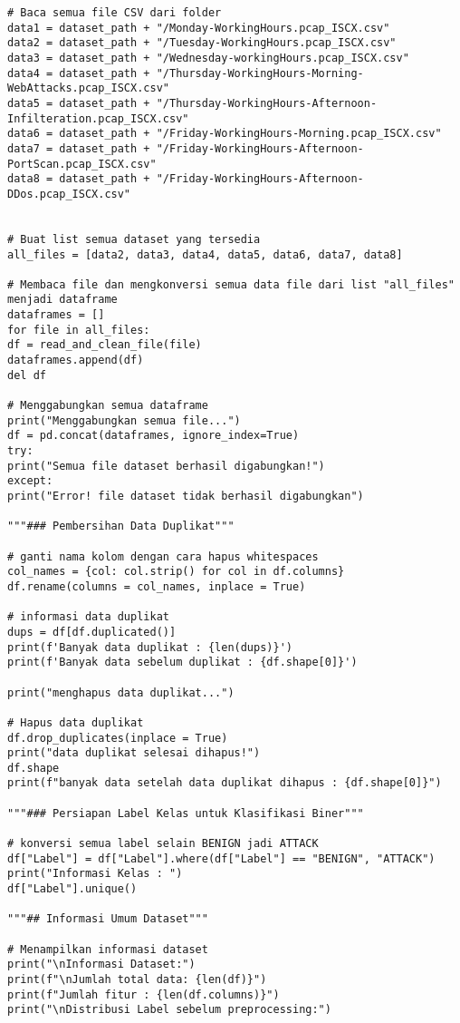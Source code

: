 \documentclass[a4paper,12pt]{report}
\begin{document}
\begin{lstlisting}
# Baca semua file CSV dari folder
data1 = dataset_path + "/Monday-WorkingHours.pcap_ISCX.csv"
data2 = dataset_path + "/Tuesday-WorkingHours.pcap_ISCX.csv"
data3 = dataset_path + "/Wednesday-workingHours.pcap_ISCX.csv"
data4 = dataset_path + "/Thursday-WorkingHours-Morning-WebAttacks.pcap_ISCX.csv"
data5 = dataset_path + "/Thursday-WorkingHours-Afternoon-Infilteration.pcap_ISCX.csv"
data6 = dataset_path + "/Friday-WorkingHours-Morning.pcap_ISCX.csv"
data7 = dataset_path + "/Friday-WorkingHours-Afternoon-PortScan.pcap_ISCX.csv"
data8 = dataset_path + "/Friday-WorkingHours-Afternoon-DDos.pcap_ISCX.csv"


# Buat list semua dataset yang tersedia
all_files = [data2, data3, data4, data5, data6, data7, data8]

# Membaca file dan mengkonversi semua data file dari list "all_files" menjadi dataframe
dataframes = []
for file in all_files:
df = read_and_clean_file(file)
dataframes.append(df)
del df

# Menggabungkan semua dataframe
print("Menggabungkan semua file...")
df = pd.concat(dataframes, ignore_index=True)
try:
print("Semua file dataset berhasil digabungkan!")
except:
print("Error! file dataset tidak berhasil digabungkan")

"""### Pembersihan Data Duplikat"""

# ganti nama kolom dengan cara hapus whitespaces
col_names = {col: col.strip() for col in df.columns}
df.rename(columns = col_names, inplace = True)

# informasi data duplikat
dups = df[df.duplicated()]
print(f'Banyak data duplikat : {len(dups)}')
print(f'Banyak data sebelum duplikat : {df.shape[0]}')

print("menghapus data duplikat...")

# Hapus data duplikat
df.drop_duplicates(inplace = True)
print("data duplikat selesai dihapus!")
df.shape
print(f"banyak data setelah data duplikat dihapus : {df.shape[0]}")

"""### Persiapan Label Kelas untuk Klasifikasi Biner"""

# konversi semua label selain BENIGN jadi ATTACK
df["Label"] = df["Label"].where(df["Label"] == "BENIGN", "ATTACK")
print("Informasi Kelas : ")
df["Label"].unique()

"""## Informasi Umum Dataset"""

# Menampilkan informasi dataset
print("\nInformasi Dataset:")
print(f"\nJumlah total data: {len(df)}")
print(f"Jumlah fitur : {len(df.columns)}")
print("\nDistribusi Label sebelum preprocessing:")


\end{lstlisting}
\end{document}

